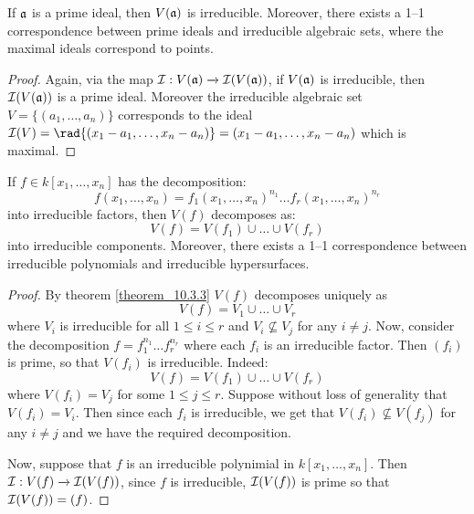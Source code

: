 \begin{corollary}
  If $\mathfrak{a}$ is a prime ideal, then  $V(\mathfrak{a})$ is irreducible. Moreover,
  there exists a 1--1 correspondence between prime ideals and
  irreducible algebraic sets, where the maximal ideals correspond to
  points.
\end{corollary}
\begin{proof}
  Again, via the map $\mathcal{I}:V(\mathfrak{a}) \xrightarrow{} \mathcal{I}(V(\mathfrak{a}))$, if
  $V(\mathfrak{a})$ is irreducible, then $\mathcal{I}(V(\mathfrak{a}))$ is a prime ideal.
  Moreover the irreducible algebraic set $V=\{(a_1, \dots, a_n)\}$
  corresponds to the ideal $\Ic(V)=\rad{(x_1-a_1, \dots, x_n-a_n)}=
  (x_1-a_1, \dots, x_n-a_n)$ which is maximal.
\end{proof}
\begin{corollary}
  If $f \in k[x_1, \dots, x_n]$ has the decomposition:
  \begin{equation*}
    f(x_1, \dots, x_n)=
    f_1(x_1, \dots, x_n)^{n_1} \dots f_r(x_1, \dots, x_n)^{n_r}
  \end{equation*}
  into irreducible factors, then $V(f)$ decomposes as:
  \begin{equation*}
    V(f)=V(f_1) \cup \dots \cup V(f_r)
  \end{equation*}
  into irreducible components. Moreover, there exists a 1--1
  correspondence between irreducible polynomials and irreducible
  hypersurfaces.
\end{corollary}
\begin{proof}
  By theorem \ref{theorem_10.3.3} $V(f)$ decomposes uniquely as
  \begin{equation*}
    V(f)=V_1 \cup \dots \cup V_r
  \end{equation*}
  where $V_i$ is irreducible for all $1 \leq i \leq r$ and $V_i
  \not\subseteq V_j$ for any $i \neq j$. Now, consider the
  decomposition $f=f_1^{n_1} \dots f_r^{n_r}$ where each $f_i$ is an
  irreducible factor. Then $(f_i)$ is prime, so that $V(f_i)$ is
  irreducible. Indeed:
  \begin{equation*}
    V(f)=V(f_1) \cup \dots \cup V(f_r)
  \end{equation*}
  where $V(f_i)=V_j$ for some $1 \leq j \leq r$. Suppose without loss
  of generality that $V(f_i)=V_i$. Then since each $f_i$ is
  irreducible, we get that  $V(f_i) \not\subseteq V(f_j)$ for any $i
  \neq j$ and we have the required decomposition.

  Now, suppose that $f$ is an irreducible polynimial in $k[x_1, \dots,
  x_n]$. Then $\mathcal{I}:V(f) \xrightarrow{} \mathcal{I}(V(f))$, since $f$ is
  irreducible, $\mathcal{I}(V(f))$ is prime so that $\mathcal{I}(V(f))=(f)$.
\end{proof}

